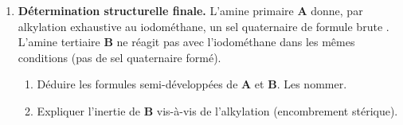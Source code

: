 \documentclass[11pt]{article}
\begin{document}
\begin{exercice}
\begin{enumerate}
\begin{enumerate}
    \end{enumerate}
    \item \textbf{Détermination structurelle finale.} L'amine primaire \textbf{A} donne, par alkylation exhaustive au iodométhane, un sel quaternaire de formule brute . L'amine tertiaire \textbf{B} ne réagit pas avec l'iodométhane dans les mêmes conditions (pas de sel quaternaire formé).
    \begin{enumerate}
        \item Déduire les formules semi-développées de \textbf{A} et \textbf{B}. Les nommer.
        \item Expliquer l'inertie de \textbf{B} vis-à-vis de l'alkylation (encombrement stérique).
    \end{enumerate}
\end{enumerate}
\end{exercice}
\end{document}
